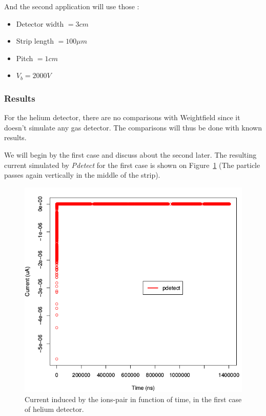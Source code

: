 \documentclass[11pt]{article}
\begin{document}
				And the second application will use those :

				\begin{itemize}

					\item Detector width $= 3 cm$
					\item Strip length $= 100 \mu m$
					\item Pitch $= 1 cm$
					\item $V_b = 2000 V$

				\end{itemize}

			\subsubsection*{Results}

				For the helium detector, there are no comparisons with Weightfield since it doesn't simulate
				any gas detector. The comparisons will thus be done with known results.

				We will begin by the first case and discuss about the second later.
				The resulting current simulated by \textit{Pdetect} for the first case is shown on
				Figure~\ref{fig:helium1_unprecise} (The particle passes again vertically in the middle of
				the strip).

				\begin{figure}[H]
				  \center
				  \includegraphics[scale=0.5]{images/applications/helium1_unprecise.png}
				  \caption{Current induced by the ions-pair in function of time, in the first case of helium detector.}
				  \label{fig:helium1_unprecise}
				\end{figure}
\end{document}
